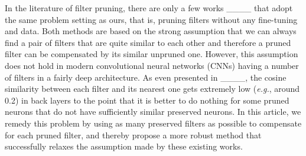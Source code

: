  In the literature of filter pruning, there are only a few works ____ that adopt the same problem setting as ours, that is, pruning filters without any fine-tuning and data.  Both methods are based on the strong assumption that we can always find a pair of filters that are quite similar to each other and therefore a pruned filter can be compensated by its similar unpruned one. However, this assumption does not hold in modern convolutional neural networks (CNNs) having a number of filters in a fairly deep architecture. As even presented in ____, the cosine similarity between each filter and its nearest one gets extremely low (\textit{e.g.}, around 0.2) in back layers to the point that it is better to do nothing for some pruned neurons that do not have sufficiently similar preserved neurons. In this article, we remedy this problem by using as many preserved filters as possible to compensate for each pruned filter, and thereby propose a more robust method that successfully relaxes the assumption made by these existing works. 







